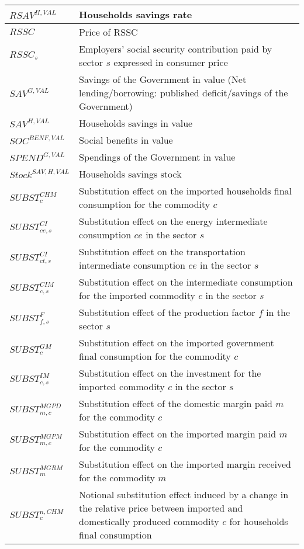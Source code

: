 \documentclass[12pt]{article}
\numberwithin{equation}{section}
\begin{document}
\begin{longtable}{@{}p{4cm}p{9cm}@{}}
$RSAV^{H,VAL}$ & Households savings rate \\
 \midrule 
$RSSC$ & Price of RSSC \\
 \midrule 
$RSSC_{s}$ & Employers' social security contribution paid by sector $s$ expressed in consumer price \\
 \midrule 
$SAV^{G,VAL}$ & Savings of the Government in value (Net lending/borrowing: published deficit/savings of the Government) \\
 \midrule 
$SAV^{H,VAL}$ & Households savings in value \\
 \midrule 
$SOC^{BENF,VAL}$ & Social benefits in value \\
 \midrule 
$SPEND^{G,VAL}$ & Spendings of the Government in value \\
 \midrule 
$Stock^{SAV,H,VAL}$ & Households savings stock \\
 \midrule 
$SUBST^{CHM}_{c}$ & Substitution effect on the imported households final consumption for the commodity $c$ \\
 \midrule 
$SUBST^{CI}_{ce, s}$ & Substitution effect on the energy intermediate consumption $ce$ in the sector $s$ \\
 \midrule 
$SUBST^{CI}_{ct, s}$ & Substitution effect on the transportation intermediate consumption $ce$ in the sector $s$ \\
 \midrule 
$SUBST^{CIM}_{c, s}$ & Substitution effect on the intermediate consumption for the imported commodity $c$ in the sector $s$ \\
 \midrule 
$SUBST^{F}_{f, s}$ & Substitution effect of the production factor $f$ in the sector $s$ \\
 \midrule 
$SUBST^{GM}_{c}$ & Substitution effect on the imported government final consumption for the commodity $c$ \\
 \midrule 
$SUBST^{IM}_{c, s}$ & Substitution effect on the investment for the imported commodity $c$ in the sector $s$ \\
 \midrule 
$SUBST^{MGPD}_{m, c}$ & Substitution effect of the domestic margin paid $m$ for the commodity $c$ \\
 \midrule 
$SUBST^{MGPM}_{m, c}$ & Substitution effect on the imported margin paid $m$ for the commodity $c$ \\
 \midrule 
$SUBST^{MGRM}_{m}$ & Substitution effect on the imported margin received for the commodity $m$ \\
 \midrule 
$SUBST^{n,CHM}_{c}$ & Notional substitution effect induced by a change in the relative price between imported and domestically produced commodity $c$ for households final consumption \\

\end{longtable}
\end{document}
